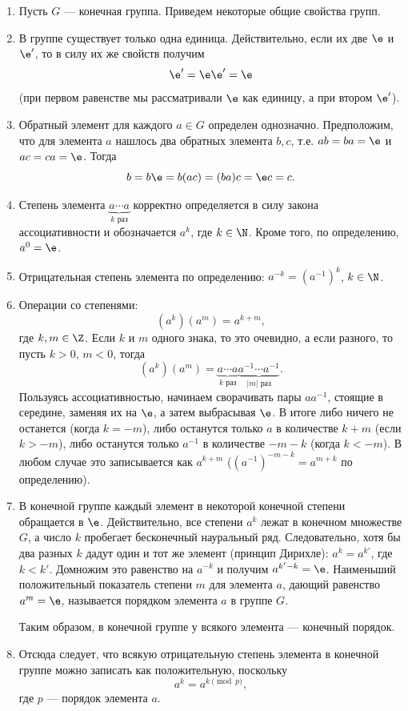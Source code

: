 \begin{enumerate}

\item Пусть $G$ --- конечная группа. Приведем некоторые общие свойства групп.

\item В группе существует только одна единица. Действительно, если их две $\e$ и $\e'$, то в силу их же свойств получим
$$
\e' = \e\e' = \e
$$
(при первом равенстве мы рассматривали $\e$ как единицу, а при втором $\e'$).
\item Обратный элемент для каждого $a\in G$ определен однозначно. Предположим, что для элемента $a$ нашлось два обратных элемента $b,c$, т.е. $ab=ba=\e$ и $ac=ca=\e$. Тогда
$$
b=b\e=b(ac)=(ba)c=\e c=c.
$$
\item Степень элемента $\underbrace{a\cdots a}_{k\mbox{ раз}}$ корректно определяется в силу закона ассоциативности и обозначается $a^k$, где $k\in\N$. Кроме того, по определению, $a^0=\e$.
\item Отрицательная степень элемента по определению: $a^{-k}=(a^{-1})^k$, $k\in\N$.
\item Операции со степенями:
$$
(a^k)(a^m)=a^{k+m},
$$
где $k,m\in \Z$. Если $k$ и $m$ одного знака, то это очевидно, а если разного, то пусть $k>0$, $m<0$, тогда
$$
(a^k)(a^m) = \underbrace{a\cdots a}_{k\mbox{ раз}}\underbrace{a^{-1}\cdots a^{-1}}_{|m|\mbox{ раз}}.
$$
Пользуясь ассоциативностью, начинаем сворачивать пары $aa^{-1}$, стоящие в середине, заменяя их на $\e$, а затем выбрасывая $\e$. В итоге либо ничего не останется (когда $k=-m$), либо останутся только $a$ в количестве $k+m$ (если $k>-m$), либо останутся только $a^{-1}$ в количестве $-m-k$ (когда $k<-m$). В любом случае это записывается как $a^{k+m}$ ($(a^{-1})^{-m-k}=a^{m+k}$ по определению).


\item В конечной группе каждый элемент в некоторой конечной степени обращается в $\e$. Действительно, все степени $a^k$ лежат в конечном множестве $G$, а число $k$ пробегает бесконечный науральный ряд. Следовательно, хотя бы два разных $k$ дадут один и тот же элемент (принцип Дирихле): $a^k=a^{k'}$, где $k<k'$. Домножим это равенство на $a^{-k}$ и получим $a^{k'-k}=\e$. Наименьший положительный показатель степени $m$ для элемента $a$, дающий равенство $a^m=\e$, называется порядком элемента $a$ в группе $G$.

Таким образом, в конечной группе у всякого элемента --- конечный порядок.

\item Отсюда следует, что всякую отрицательную степень элемента в конечной группе можно записать как положительную, поскольку
$$
a^k = a^{k\pmod p},
$$
где $p$ --- порядок элемента $a$.


\end{enumerate}

